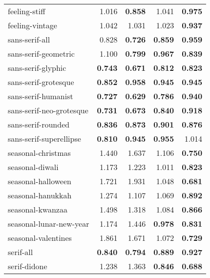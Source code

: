 \begin{longtable}{|l|r|r|r|r|}
feeling-stiff             & 1.016          & \textbf{0.858} & 1.041          & \textbf{0.975} \\
feeling-vintage           & 1.042          & 1.031          & 1.023          & \textbf{0.937} \\
sans-serif-all            & 0.828          & \textbf{0.726} & \textbf{0.859} & \textbf{0.959} \\
sans-serif-geometric      & 1.100          & \textbf{0.799} & \textbf{0.967} & \textbf{0.839} \\
sans-serif-glyphic        & \textbf{0.743} & \textbf{0.671} & \textbf{0.812} & \textbf{0.823} \\
sans-serif-grotesque      & \textbf{0.852} & \textbf{0.958} & \textbf{0.945} & \textbf{0.945} \\
sans-serif-humanist       & \textbf{0.727} & \textbf{0.629} & \textbf{0.786} & \textbf{0.940} \\
sans-serif-neo-grotesque  & \textbf{0.731} & \textbf{0.673} & \textbf{0.840} & \textbf{0.918} \\
sans-serif-rounded        & \textbf{0.836} & \textbf{0.873} & \textbf{0.901} & \textbf{0.876} \\
sans-serif-superellipse   & \textbf{0.810} & \textbf{0.945} & \textbf{0.955} & 1.014          \\
seasonal-christmas        & 1.440          & 1.637          & 1.106          & \textbf{0.750} \\
seasonal-diwali           & 1.173          & 1.223          & 1.011          & \textbf{0.823} \\
seasonal-halloween        & 1.721          & 1.931          & 1.048          & \textbf{0.681} \\
seasonal-hanukkah         & 1.274          & 1.107          & 1.069          & \textbf{0.892} \\
seasonal-kwanzaa          & 1.498          & 1.318          & 1.084          & \textbf{0.866} \\
seasonal-lunar-new-year   & 1.174          & 1.446          & \textbf{0.978} & \textbf{0.831} \\
seasonal-valentines       & 1.861          & 1.671          & 1.072          & \textbf{0.729} \\
serif-all                 & \textbf{0.840} & \textbf{0.794} & \textbf{0.889} & \textbf{0.927} \\
serif-didone              & 1.238          & 1.363          & \textbf{0.846} & \textbf{0.688} \\

\end{longtable}
